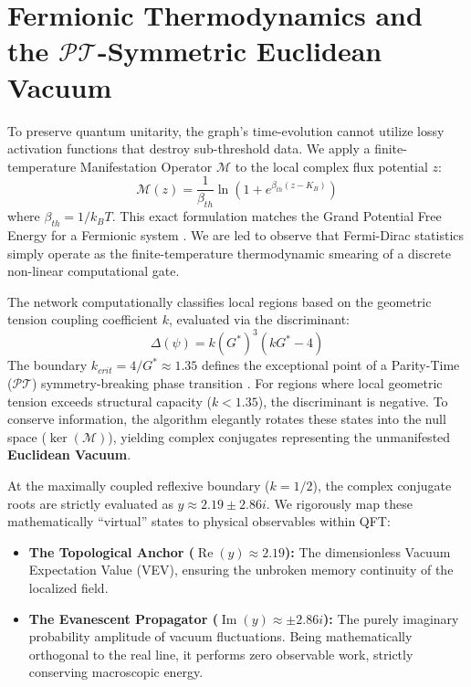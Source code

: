 \documentclass[11pt, letterpaper]{article}
\newcommand{\G}{G^*}
\newcommand{\PT}{\mathcal{PT}}
\DeclareMathOperator{\ReOp}{Re}
\DeclareMathOperator{\ImOp}{Im}
\theoremstyle{definition}
\theoremstyle{remark}
\begin{document}
\section{Fermionic Thermodynamics and the $\PT$-Symmetric Euclidean Vacuum}

To preserve quantum unitarity, the graph's time-evolution cannot utilize lossy activation functions that destroy sub-threshold data. We apply a finite-temperature Manifestation Operator $\mathcal{M}$ to the local complex flux potential $z$:
\begin{equation}
    \mathcal{M}(z) = \frac{1}{\beta_{th}} \ln\left(1 + e^{\beta_{th} (z - K_B)}\right)
\end{equation}
where $\beta_{th} = 1/k_B T$. This exact formulation matches the Grand Potential Free Energy for a Fermionic system \cite{Landau1980}. We are led to observe that Fermi-Dirac statistics simply operate as the finite-temperature thermodynamic smearing of a discrete non-linear computational gate.

The network computationally classifies local regions based on the geometric tension coupling coefficient $k$, evaluated via the discriminant:
\begin{equation}
    \Delta(\psi) = k(\G)^3(k\G - 4)
\end{equation}
The boundary $k_{crit} = 4/\G \approx 1.35$ defines the exceptional point of a Parity-Time ($\PT$) symmetry-breaking phase transition \cite{Bender1998}. For regions where local geometric tension exceeds structural capacity ($k < 1.35$), the discriminant is negative. To conserve information, the algorithm elegantly rotates these states into the null space ($\ker(\mathcal{M})$), yielding complex conjugates representing the unmanifested \textbf{Euclidean Vacuum}.

At the maximally coupled reflexive boundary ($k=1/2$), the complex conjugate roots are strictly evaluated as $y \approx 2.19 \pm 2.86i$. We rigorously map these mathematically ``virtual'' states to physical observables within QFT:
\begin{itemize}[noitemsep]
    \item \textbf{The Topological Anchor ($\ReOp(y) \approx 2.19$):} The dimensionless Vacuum Expectation Value (VEV), ensuring the unbroken memory continuity of the localized field.
    \item \textbf{The Evanescent Propagator ($\ImOp(y) \approx \pm 2.86i$):} The purely imaginary probability amplitude of vacuum fluctuations. Being mathematically orthogonal to the real line, it performs zero observable work, strictly conserving macroscopic energy.
\end{itemize}
\end{document}
